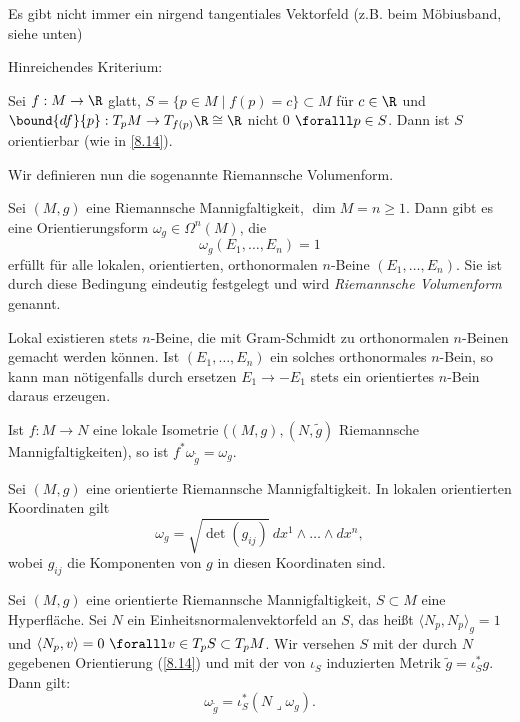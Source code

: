 \begin{rem*}
	Es gibt nicht immer ein nirgend tangentiales Vektorfeld (z.B. beim Möbiusband, siehe unten)
\end{rem*}

\noindent Hinreichendes Kriterium:

\begin{lem}
	Sei \( f:M \to \R \) glatt, \( S = \{p \in M \mid f(p) = c\} \subset M \) für $c \in \R$ und \( \bound{df}{p}: T_pM \to T_{f(p)}\R \cong \R \) nicht 0 $\foralll p \in S$. Dann ist $S$ orientierbar (wie in \ref{8.14}).
\end{lem}

\noindent Wir definieren nun die sogenannte Riemannsche Volumenform.

\begin{lem}
	Sei \( (M,g) \) eine Riemannsche Mannigfaltigkeit, $\dim M = n \geq 1$. Dann gibt es eine Orientierungsform \( \omega_g \in \Omega^n(M) \), die
	\[ \omega_g(E_1, \dotsc,E_n) = 1 \]
	erfüllt für alle lokalen, orientierten, orthonormalen $n$-Beine \( (E_1,\dotsc,E_n) \). Sie ist durch diese Bedingung eindeutig festgelegt und wird \emph{Riemannsche Volumenform} genannt.
\end{lem}

\begin{rem*}
	Lokal existieren stets $n$-Beine, die mit Gram-Schmidt zu orthonormalen $n$-Beinen gemacht werden können. Ist \( (E_1,\dotsc,E_n) \) ein solches orthonormales $n$-Bein, so kann man nötigenfalls durch ersetzen \( E_1 \to -E_1 \) stets ein orientiertes $n$-Bein daraus erzeugen.
\end{rem*}

\begin{rem*}
	Ist \( f: M \to N \) eine lokale Isometrie (\( (M,g),(N,\tilde{g}) \) Riemannsche Mannigfaltigkeiten), so ist \( f^*\omega_{\tilde{g}} = \omega_g \).
\end{rem*}

\begin{lem}
	Sei \( (M,g) \) eine orientierte Riemannsche Mannigfaltigkeit. In lokalen orientierten Koordinaten gilt
	\[ \omega_g = \sqrt{\det(g_{ij})}\ dx^1 \wedge \dots \wedge dx^n, \]
	wobei $g_{ij}$ die Komponenten von $g$ in diesen Koordinaten sind.
\end{lem}

\begin{lem}
	Sei \( (M,g) \) eine orientierte Riemannsche Mannigfaltigkeit, \( S \subset M \) eine Hyperfläche. Sei $N$ ein Einheitsnormalenvektorfeld an $S$, das heißt \( \langle N_p,N_p \rangle_g = 1 \) und \( \langle N_p,v \rangle = 0 \ \foralll v \in T_pS \subset T_pM \). Wir versehen $S$ mit der durch $N$ gegebenen Orientierung (\ref{8.14}) und mit der von \( \iota_S \) induzierten Metrik \( \tilde{g} = \iota_S^*g \). Dann gilt:
	\[ \omega_{\tilde{g}} = \iota_S^*(N \lrcorner \omega_g). \]
\end{lem}
